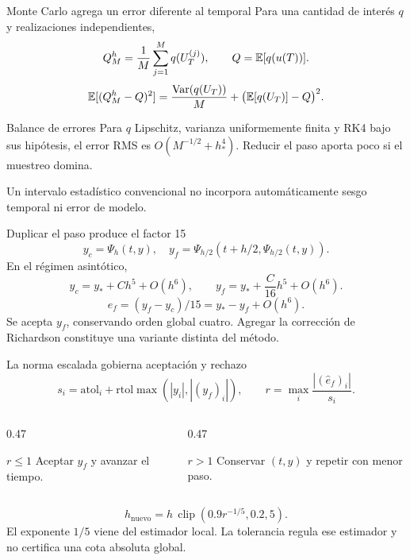 \documentclass[aspectratio=169,11pt]{beamer}
\begin{document}
\begin{frame}{Monte Carlo agrega un error diferente al temporal}
Para una cantidad de interés $q$ y realizaciones independientes,
\[
Q_M^h=\frac1M\sum_{j=1}^M q(U_T^{(j)}),\qquad
Q=\mathbb E[q(u(T))].
\]
\[
\mathbb E[(Q_M^h-Q)^2]
=\frac{\operatorname{Var}(q(U_T))}{M}
+\bigl(\mathbb E[q(U_T)]-Q\bigr)^2.
\]
\begin{block}{Balance de errores}
Para $q$ Lipschitz, varianza uniformemente finita y RK4 bajo sus hipótesis, el error RMS es
$O(M^{-1/2}+h_*^4)$. Reducir el paso aporta poco si el muestreo domina.
\end{block}
\small Un intervalo estadístico convencional no incorpora automáticamente
sesgo temporal ni error de modelo.
\end{frame}

\begin{frame}{Duplicar el paso produce el factor 15}
\[
y_c=\Psi_h(t,y),\quad
y_f=\Psi_{h/2}(t+h/2,\Psi_{h/2}(t,y)).
\]
En el régimen asintótico,
\[
y_c=y_*+Ch^5+O(h^6),\qquad
y_f=y_*+\frac{C}{16}h^5+O(h^6).
\]
\[
\boxed{\widehat e_f=(y_f-y_c)/15=y_*-y_f+O(h^6).}
\]
Se acepta $y_f$, conservando orden global cuatro. Agregar la corrección
de Richardson constituye una variante distinta del método.
\end{frame}

\begin{frame}{La norma escalada gobierna aceptación y rechazo}
\[
s_i=\mathrm{atol}_i+\mathrm{rtol}\max(|y_i|,|(y_f)_i|),\qquad
r=\max_i\frac{|(\widehat e_f)_i|}{s_i}.
\]
\begin{columns}[T]
\begin{column}{0.47\textwidth}
\begin{block}{$r\leq1$}
Aceptar $y_f$ y avanzar el tiempo.
\end{block}
\end{column}
\begin{column}{0.47\textwidth}
\begin{block}{$r>1$}
Conservar $(t,y)$ y repetir con menor paso.
\end{block}
\end{column}
\end{columns}
\vspace{0.3cm}
\[
h_{\mathrm{nuevo}}=h\,\operatorname{clip}(0.9r^{-1/5},0.2,5).
\]
\small El exponente $1/5$ viene del estimador local. La tolerancia regula ese
estimador y no certifica una cota absoluta global.
\end{frame}
\end{document}
